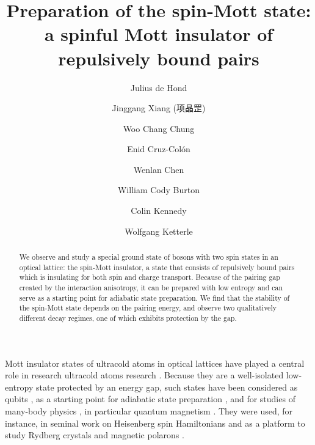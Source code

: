 \documentclass[aps,prl,twocolumn]{revtex4-1}
\begin{document}
\begin{CJK*}{UTF8}{gbsn}


\author{Julius de Hond}
\author{Jinggang Xiang (项晶罡)}
\author{Woo Chang Chung}
\author{Enid Cruz-Col\'{o}n}
\author{Wenlan Chen}
\author{William Cody Burton}
\author{Colin Kennedy}
\author{Wolfgang Ketterle}

\title{Preparation of the spin-Mott state: a spinful Mott insulator of repulsively bound pairs}

\begin{abstract}
We observe and study a special ground state of bosons with two spin states in an optical lattice: the spin-Mott insulator, a state that consists of repulsively bound pairs which is insulating for both spin and charge transport. Because of the pairing gap created by the interaction anisotropy, it can be prepared with low entropy and can serve as a starting point for adiabatic state preparation. We find that the stability of the spin-Mott state depends on the pairing energy, and observe two qualitatively different decay regimes, one of which exhibits protection by the gap.
\end{abstract}

\maketitle
\end{CJK*}

Mott insulator states of ultracold atoms in optical lattices have played a central role in research ultracold atoms research \cite{Georgescu14, Jaksch05}. Because they are a well-isolated low-entropy state protected by an energy gap, such states have been considered as qubits \cite{Weitenberg11}, as a starting point for adiabatic state preparation \cite{Schachenmayer15, Lubasch11}, and for studies of many-body physics \cite{Bloch08}, in particular quantum magnetism \cite{GarciaRipoll04}. They were used, for instance, in seminal work on Heisenberg spin Hamiltonians \cite{Struck11,dePaz13,Simon11} and as a platform to study Rydberg crystals \cite{Schauss15} and magnetic polarons \cite{Koepsell19}.
\end{document}
